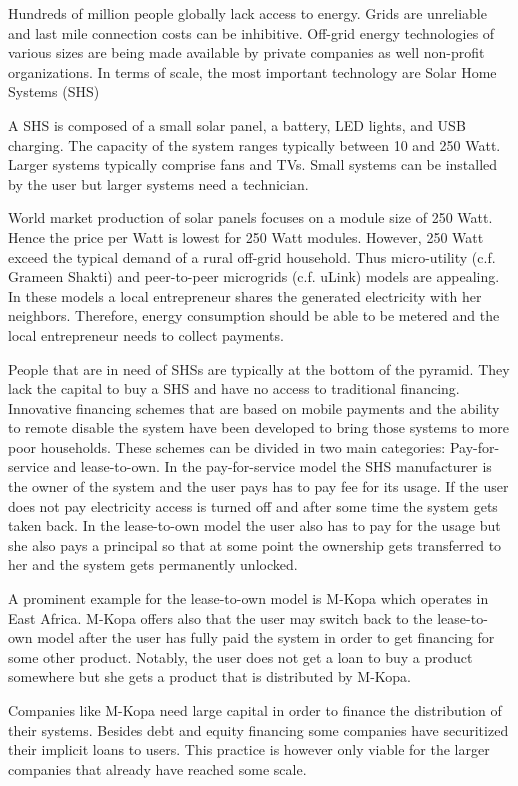 Hundreds of million people globally lack access to energy. Grids are unreliable and last mile connection costs can be inhibitive. Off-grid energy technologies of various sizes are being made available by private companies as well non-profit organizations. In terms of scale, the most important technology are Solar Home Systems (SHS)

A SHS is composed of a small solar panel, a battery, LED lights, and USB charging. The capacity of the system ranges typically between 10 and 250 Watt. Larger systems typically comprise fans and TVs. Small systems can be installed by the user but larger systems need a technician.

World market production of solar panels focuses on a module size of 250 Watt. Hence the price per Watt is lowest for 250 Watt modules. However, 250 Watt exceed the typical demand of a rural off-grid household. Thus micro-utility (c.f. Grameen Shakti) and peer-to-peer microgrids (c.f. uLink) models are appealing. In these models a local entrepreneur shares the generated electricity with her neighbors. Therefore, energy consumption should be able to be metered and the local entrepreneur needs to collect payments.

People that are in need of SHSs are typically at the bottom of the pyramid. They lack the capital to buy a SHS and have no access to traditional financing. Innovative financing schemes that are based on mobile payments and the ability to remote disable the system have been developed to bring those systems to more poor households. These schemes can be divided in two main categories: Pay-for-service and lease-to-own. In the pay-for-service model the SHS manufacturer is the owner of the system and the user pays has to pay fee for its usage. If the user does not pay electricity access is turned off and after some time the system gets taken back. In the lease-to-own model the user also has to pay for the usage but she also pays a principal so that at some point the ownership gets transferred to her and the system gets permanently unlocked. 

A prominent example for the lease-to-own model is M-Kopa which operates in East Africa. M-Kopa offers also that the user may switch back to the lease-to-own model after the user has fully paid the system in order to get financing for some other product. Notably, the user does not get a loan to buy a product somewhere but she gets a product that is distributed by M-Kopa. 

Companies like M-Kopa need large capital in order to finance the distribution of their systems. Besides debt and equity financing some companies have securitized their implicit loans to users. This practice is however only viable for the larger companies that already have reached some scale. 

